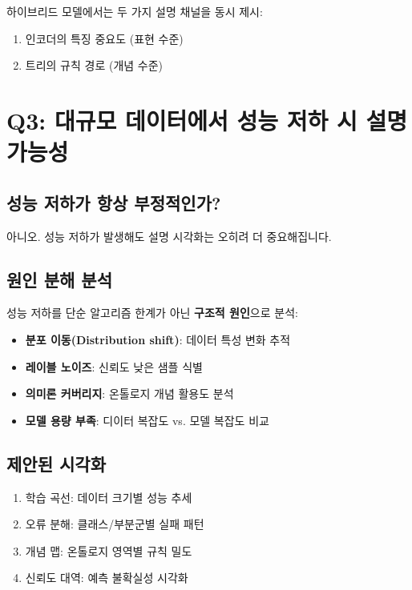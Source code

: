 \documentclass[11pt, twocolumn]{article}
\begin{document}
하이브리드 모델에서는 두 가지 설명 채널을 동시 제시:
\begin{enumerate}
    \item 인코더의 특징 중요도 (표현 수준)
    \item 트리의 규칙 경로 (개념 수준)
\end{enumerate}

\section{Q3: 대규모 데이터에서 성능 저하 시 설명 가능성}

\subsection{성능 저하가 항상 부정적인가?}

아니오. 성능 저하가 발생해도 설명 시각화는 오히려 더 중요해집니다.

\subsection{원인 분해 분석}

성능 저하를 단순 알고리즘 한계가 아닌 \textbf{구조적 원인}으로 분석:

\begin{itemize}
    \item \textbf{분포 이동(Distribution shift)}: 데이터 특성 변화 추적
    \item \textbf{레이블 노이즈}: 신뢰도 낮은 샘플 식별
    \item \textbf{의미론 커버리지}: 온톨로지 개념 활용도 분석
    \item \textbf{모델 용량 부족}: 디이터 복잡도 vs. 모델 복잡도 비교
\end{itemize}

\subsection{제안된 시각화}

\begin{enumerate}
    \item 학습 곡선: 데이터 크기별 성능 추세
    \item 오류 분해: 클래스/부분군별 실패 패턴
    \item 개념 맵: 온톨로지 영역별 규칙 밀도
    \item 신뢰도 대역: 예측 불확실성 시각화
\end{enumerate}
\end{document}
